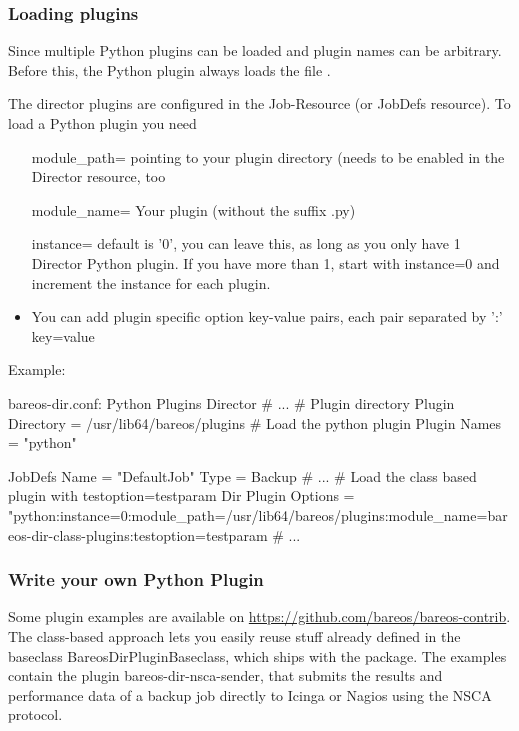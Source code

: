 \subsubsection{Loading plugins}

Since  multiple Python plugins can be loaded and plugin names can be arbitrary. Before this, the Python plugin always loads the file .

The director plugins are configured in the Job-Resource (or JobDefs resource). To load a Python plugin you need
\begin{itemize}
 \item [module\_path= ] pointing to your plugin directory (needs to be enabled in the Director resource, too
 \item [module\_name= ] Your plugin (without the suffix .py)
 \item [instance= ] default is '0', you can leave this, as long as you only have 1 Director Python plugin. If you have more than 1, start with instance=0 and increment the instance for each plugin.
 \item You can add plugin specific option key-value pairs, each pair separated by ':' key=value
\end{itemize}


Example:

\begin{bconfig}{bareos-dir.conf: Python Plugins}
Director {
  # ...
  # Plugin directory
  Plugin Directory = /usr/lib64/bareos/plugins
  # Load the python plugin
  Plugin Names = "python"
}

JobDefs {
  Name = "DefaultJob"
  Type = Backup
  # ...
  # Load the class based plugin with testoption=testparam
  Dir Plugin Options = "python:instance=0:module_path=/usr/lib64/bareos/plugins:module_name=bareos-dir-class-plugins:testoption=testparam
  # ...
}
\end{bconfig}

\subsubsection{Write your own Python Plugin}

Some plugin examples are available on \url{https://github.com/bareos/bareos-contrib}. 
The class-based approach lets you easily reuse stuff already
defined in the baseclass BareosDirPluginBaseclass, which ships with the  package.
The examples contain the plugin bareos-dir-nsca-sender, that submits the results and performance data of a backup job directly to Icinga or Nagios using the NSCA protocol.
